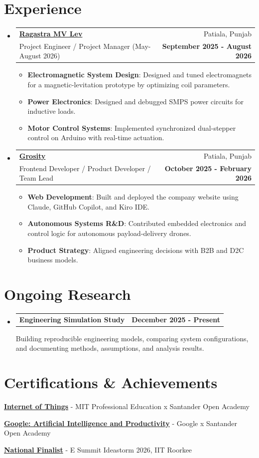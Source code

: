 \documentclass[a4paper,10pt]{article}
\makeatletter
\newcommand{\resumeItem}[2]{
  \item\normalsize{
    \textbf{#1}{: #2}
  }
}
\newcommand{\resumeSubheading}[4]{
  \vspace{-1pt}\item
    \begin{tabular*}{0.97\textwidth}{l@{\extracolsep{\fill}}r}
      \textbf{#1} & #2 \\
      #3 & \textbf{#4} \\
    \end{tabular*}\vspace{-5pt}
}
\newcommand{\resumeResearchItem}[3]{
  \item\normalsize{
    \begin{tabular*}{0.97\textwidth}{l@{\extracolsep{\fill}}r}
      \textbf{#1} & \textbf{#3} \\
    \end{tabular*}
    \vspace{-2pt}
    #2
  }
}
\newcommand{\resumeSubHeadingListStart}{\begin{itemize}[leftmargin=*]}
\newcommand{\resumeSubHeadingListEnd}{\end{itemize}}
\newcommand{\resumeItemListStart}{\begin{itemize}}
\newcommand{\resumeItemListEnd}{\end{itemize}\vspace{-5pt}}
\makeatother
\begin{document}
\section{Experience}
  \resumeSubHeadingListStart
    \resumeSubheading{\href{https://ragastra-mvlev.vercel.app}{Ragastra MV Lev}}{Patiala, Punjab}
    {Project Engineer / Project Manager (May-August 2026)}{September 2025 - August 2026}
    \resumeItemListStart
        \resumeItem{Electromagnetic System Design}
          {Designed and tuned electromagnets for a magnetic-levitation prototype by optimizing coil parameters.}
        \resumeItem{Power Electronics}
          {Designed and debugged SMPS power circuits for inductive loads.}
        \resumeItem{Motor Control Systems}
          {Implemented synchronized dual-stepper control on Arduino with real-time actuation.}
      \resumeItemListEnd
\vspace{-5pt}
    \resumeSubheading
		{\href{https://grosity.in}{Grosity}}{Patiala, Punjab}
		{Frontend Developer / Product Developer / Team Lead}{October 2025 - February 2026}
		\resumeItemListStart
        \resumeItem{Web Development}
          {Built and deployed the company website using Claude, GitHub Copilot, and Kiro IDE.}
        \resumeItem{Autonomous Systems R\&D}
          {Contributed embedded electronics and control logic for autonomous payload-delivery drones.}
        \resumeItem{Product Strategy}{Aligned engineering decisions with B2B and D2C business models.}
		\resumeItemListEnd

\resumeSubHeadingListEnd

\vspace{-5pt}
\section{Ongoing Research}
\resumeSubHeadingListStart
\resumeResearchItem{Engineering Simulation Study}{Building reproducible engineering models, comparing system configurations, and documenting methods, assumptions, and analysis results.}{December 2025 - Present}
\resumeSubHeadingListEnd

\vspace{-5pt}
\section{Certifications \& Achievements}
\begin{description}[font=$\bullet$]
\item {\textbf{\href{https://drive.google.com/file/d/1yQglfFhR8SS8y3ibK8zGnDyMitvzIPrU/view}{Internet of Things}} - MIT Professional Education x Santander Open Academy}
\vspace{-5pt}
\item {\textbf{\href{https://drive.google.com/file/d/16lO-SM8k2TGsSAl6qkyhInfl8d3UZnD5/view}{Google: Artificial Intelligence and Productivity}} - Google x Santander Open Academy}
\vspace{-5pt}
\item {\textbf{\href{https://certificate.givemycertificate.com/c/01f27daf-d843-45ac-b6f9-67cbdf4fc440}{National Finalist}} - E Summit Ideastorm 2026, IIT Roorkee}
\end{description}
\end{document}
